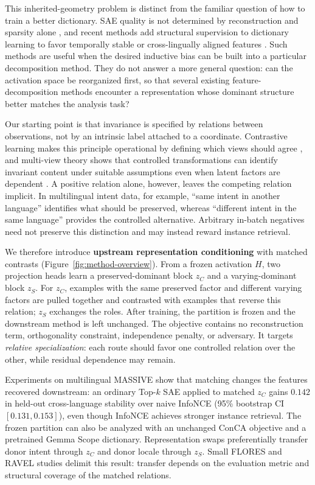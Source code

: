 \documentclass[11pt]{article}
\begin{document}
This inherited-geometry problem is distinct from the familiar question of how to train a better dictionary. SAE quality is not determined by reconstruction and sparsity alone \citep{karvonen2025saebench}, and recent methods add structural supervision to dictionary learning to favor temporally stable or cross-lingually aligned features \citep{bhalla2026temporal,bogdanov2026geometry}. Such methods are useful when the desired inductive bias can be built into a particular decomposition method. They do not answer a more general question: can the activation space be reorganized first, so that several existing feature-decomposition methods encounter a representation whose dominant structure better matches the analysis task?

Our starting point is that invariance is specified by relations between observations, not by an intrinsic label attached to a coordinate. Contrastive learning makes this principle operational by defining which views should agree \citep{oord2018cpc}, and multi-view theory shows that controlled transformations can identify invariant content under suitable assumptions even when latent factors are dependent \citep{vonkugelgen2021selfsupervised}. A positive relation alone, however, leaves the competing relation implicit. In multilingual intent data, for example, ``same intent in another language'' identifies what should be preserved, whereas ``different intent in the same language'' provides the controlled alternative. Arbitrary in-batch negatives need not preserve this distinction and may instead reward instance retrieval.

We therefore introduce \textbf{upstream representation conditioning} with matched contrasts (Figure~\ref{fig:method-overview}). From a frozen activation $H$, two projection heads learn a preserved-dominant block $z_C$ and a varying-dominant block $z_S$. For $z_C$, examples with the same preserved factor and different varying factors are pulled together and contrasted with examples that reverse this relation; $z_S$ exchanges the roles. After training, the partition is frozen and the downstream method is left unchanged. The objective contains no reconstruction term, orthogonality constraint, independence penalty, or adversary. It targets \emph{relative specialization}: each route should favor one controlled relation over the other, while residual dependence may remain.

Experiments on multilingual MASSIVE \citep{fitzgerald2023massive} show that matching changes the features recovered downstream: an ordinary Top-$k$ SAE applied to matched $z_C$ gains $0.142$ in held-out cross-language stability over naive InfoNCE (95\% bootstrap CI $[0.131,0.153]$), even though InfoNCE achieves stronger instance retrieval. The frozen partition can also be analyzed with an unchanged ConCA objective and a pretrained Gemma Scope dictionary. Representation swaps preferentially transfer donor intent through $z_C$ and donor locale through $z_S$. Small FLORES \citep{goyal2022flores} and RAVEL \citep{huang2024ravel} studies delimit this result: transfer depends on the evaluation metric and structural coverage of the matched relations.
\end{document}
